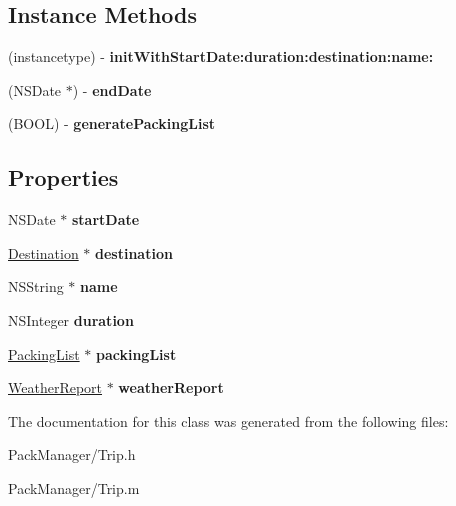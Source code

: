 \subsection*{Instance Methods}
\begin{DoxyCompactItemize}
\item 
\hypertarget{interface_trip_a99f374dbe25efd7d391eb5acc597fa2f}{(instancetype) -\/ {\bfseries init\-With\-Start\-Date\-:duration\-:destination\-:name\-:}}\label{interface_trip_a99f374dbe25efd7d391eb5acc597fa2f}

\item 
\hypertarget{interface_trip_af45eceb7475c6e48bf48641deb44baf4}{(N\-S\-Date $\ast$) -\/ {\bfseries end\-Date}}\label{interface_trip_af45eceb7475c6e48bf48641deb44baf4}

\item 
\hypertarget{interface_trip_a90808fe2b7874349bf0a5fc5a09acf3e}{(B\-O\-O\-L) -\/ {\bfseries generate\-Packing\-List}}\label{interface_trip_a90808fe2b7874349bf0a5fc5a09acf3e}

\end{DoxyCompactItemize}
\subsection*{Properties}
\begin{DoxyCompactItemize}
\item 
\hypertarget{interface_trip_aa73721dd452a5a0c94841aa155761d67}{N\-S\-Date $\ast$ {\bfseries start\-Date}}\label{interface_trip_aa73721dd452a5a0c94841aa155761d67}

\item 
\hypertarget{interface_trip_a01e96ecca04783f767f4873a821825e9}{\hyperlink{interface_destination}{Destination} $\ast$ {\bfseries destination}}\label{interface_trip_a01e96ecca04783f767f4873a821825e9}

\item 
\hypertarget{interface_trip_a66e63287102687fe25366d61889fe8e1}{N\-S\-String $\ast$ {\bfseries name}}\label{interface_trip_a66e63287102687fe25366d61889fe8e1}

\item 
\hypertarget{interface_trip_add71cec64aacd20463f15322b76577f8}{N\-S\-Integer {\bfseries duration}}\label{interface_trip_add71cec64aacd20463f15322b76577f8}

\item 
\hypertarget{interface_trip_a985205885a33d59e7e8b899cab47f2d0}{\hyperlink{interface_packing_list}{Packing\-List} $\ast$ {\bfseries packing\-List}}\label{interface_trip_a985205885a33d59e7e8b899cab47f2d0}

\item 
\hypertarget{interface_trip_a50df03c3a57389928c170792a63aa67f}{\hyperlink{interface_weather_report}{Weather\-Report} $\ast$ {\bfseries weather\-Report}}\label{interface_trip_a50df03c3a57389928c170792a63aa67f}

\end{DoxyCompactItemize}


The documentation for this class was generated from the following files\-:\begin{DoxyCompactItemize}
\item 
Pack\-Manager/Trip.\-h\item 
Pack\-Manager/Trip.\-m\end{DoxyCompactItemize}
